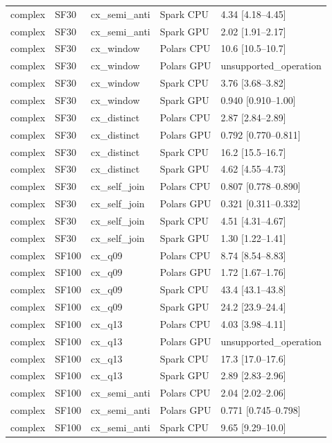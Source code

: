 \begin{longtable}{lllll}
complex & SF30 & cx\_semi\_anti & Spark CPU & 4.34 [4.18--4.45] \\
complex & SF30 & cx\_semi\_anti & Spark GPU & 2.02 [1.91--2.17] \\
complex & SF30 & cx\_window & Polars CPU & 10.6 [10.5--10.7] \\
complex & SF30 & cx\_window & Polars GPU & unsupported\_operation \\
complex & SF30 & cx\_window & Spark CPU & 3.76 [3.68--3.82] \\
complex & SF30 & cx\_window & Spark GPU & 0.940 [0.910--1.00] \\
complex & SF30 & cx\_distinct & Polars CPU & 2.87 [2.84--2.89] \\
complex & SF30 & cx\_distinct & Polars GPU & 0.792 [0.770--0.811] \\
complex & SF30 & cx\_distinct & Spark CPU & 16.2 [15.5--16.7] \\
complex & SF30 & cx\_distinct & Spark GPU & 4.62 [4.55--4.73] \\
complex & SF30 & cx\_self\_join & Polars CPU & 0.807 [0.778--0.890] \\
complex & SF30 & cx\_self\_join & Polars GPU & 0.321 [0.311--0.332] \\
complex & SF30 & cx\_self\_join & Spark CPU & 4.51 [4.31--4.67] \\
complex & SF30 & cx\_self\_join & Spark GPU & 1.30 [1.22--1.41] \\
complex & SF100 & cx\_q09 & Polars CPU & 8.74 [8.54--8.83] \\
complex & SF100 & cx\_q09 & Polars GPU & 1.72 [1.67--1.76] \\
complex & SF100 & cx\_q09 & Spark CPU & 43.4 [43.1--43.8] \\
complex & SF100 & cx\_q09 & Spark GPU & 24.2 [23.9--24.4] \\
complex & SF100 & cx\_q13 & Polars CPU & 4.03 [3.98--4.11] \\
complex & SF100 & cx\_q13 & Polars GPU & unsupported\_operation \\
complex & SF100 & cx\_q13 & Spark CPU & 17.3 [17.0--17.6] \\
complex & SF100 & cx\_q13 & Spark GPU & 2.89 [2.83--2.96] \\
complex & SF100 & cx\_semi\_anti & Polars CPU & 2.04 [2.02--2.06] \\
complex & SF100 & cx\_semi\_anti & Polars GPU & 0.771 [0.745--0.798] \\
complex & SF100 & cx\_semi\_anti & Spark CPU & 9.65 [9.29--10.0] \\

\end{longtable}
